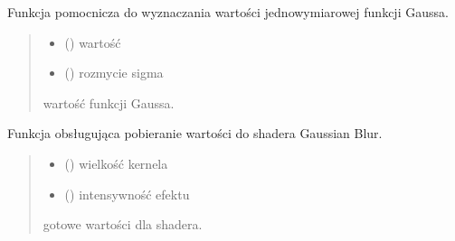 \documentclass[a4paper,10pt,openany,english]{sphinxmanual}
\begin{document}
\begin{fulllineitems}
\label{\detokenize{js/js-functions:gaussian}}
\pysigstartsignatures
\pysiglinewithargsret
{}
{\sphinxparamcomma {}}
{}
\pysigstopsignatures
\sphinxAtStartPar
Funkcja pomocnicza do wyznaczania wartości jednowymiarowej funkcji Gaussa.
\begin{quote}\begin{description}
\begin{itemize}
\item {} 
\sphinxAtStartPar
{} () \textendash{} wartość

\item {} 
\sphinxAtStartPar
{} () \textendash{} rozmycie sigma

\end{itemize}

\sphinxAtStartPar
wartość funkcji Gaussa.

\end{description}\end{quote}

\end{fulllineitems}


\begin{fulllineitems}
\label{\detokenize{js/js-functions:gaussianBlur}}
\pysigstartsignatures
\pysiglinewithargsret
{}
{\sphinxparamcomma {}}
{}
\pysigstopsignatures
\sphinxAtStartPar
Funkcja obsługująca pobieranie wartości do shadera Gaussian Blur.
\begin{quote}\begin{description}
\begin{itemize}
\item {} 
\sphinxAtStartPar
{} () \textendash{} wielkość kernela

\item {} 
\sphinxAtStartPar
{} () \textendash{} intensywność efektu

\end{itemize}

\sphinxAtStartPar
gotowe wartości dla shadera.

\end{description}\end{quote}

\end{fulllineitems}
\end{document}
